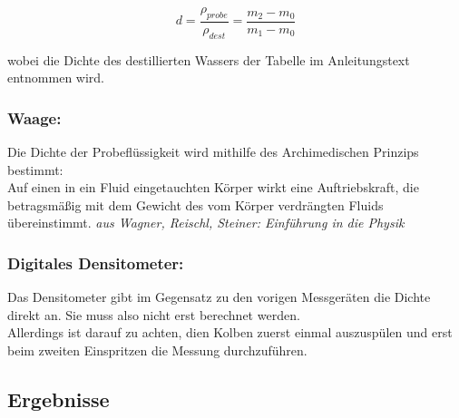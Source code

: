 \documentclass{article}
\begin{document}
\begin{equation}
d=\frac{\rho_{probe}}{\rho_{dest}}=\frac{m_2 - m_0}{m_1 - m_0}
\end{equation}

wobei die Dichte des destillierten Wassers der Tabelle im Anleitungstext entnommen wird. 

\subsubsection*{Waage:}
Die Dichte der Probeflüssigkeit wird mithilfe des Archimedischen Prinzips bestimmt: \\
Auf einen in ein Fluid eingetauchten Körper wirkt eine Auftriebskraft, die betragsmäßig mit dem Gewicht des vom Körper verdrängten Fluids übereinstimmt. \textit{aus Wagner, Reischl, Steiner: Einführung in die Physik}

\subsubsection*{Digitales Densitometer:}
Das Densitometer gibt im Gegensatz zu den vorigen Messgeräten die Dichte direkt an. Sie muss also nicht erst berechnet werden.\\
Allerdings ist darauf zu achten, dien Kolben zuerst einmal auszuspülen und erst beim zweiten Einspritzen die Messung durchzuführen.


\subsection{Ergebnisse}
\end{document}
